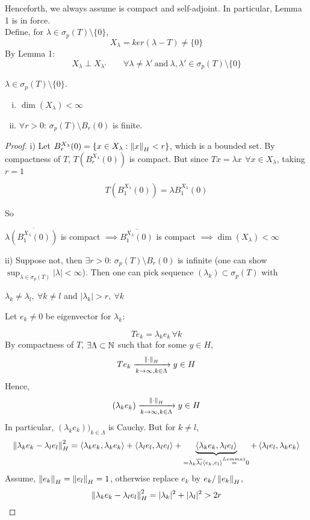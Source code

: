 \documentclass{article}
\begin{document}
Henceforth, we always assume  is compact and self-adjoint. In particular, Lemma 1 is in force.\\
Define, for $\lambda\in\sigma_p(T)\setminus\{0\}$, 
$$X_\lambda=ker(\lambda-T)\neq\{0\}$$
By Lemma 1:
$$X_{\lambda} \perp X_{\lambda '} \qquad \forall \lambda \neq {\lambda '} \ \text{and} \ \lambda , {\lambda '} \in \sigma_p(T)\setminus\{0\}$$
\begin{lemma}[Lemma 2]
	$\lambda\in\sigma_p(T)\setminus\{0\}$.
	\begin{enumerate}[i)]
		\item $\dim (X_\lambda)<\infty$
		\item $\forall r>0$: $\sigma_p(T)\setminus B_r(0)$ is finite.
	\end{enumerate}
\end{lemma}
\begin{proof}
		i) Let $B_r^{X_\lambda}(0)=\{x\in X_\lambda:\left\|{x}\right\|_H<r\}$, which is a bounded set. By compactness of $T$, $T(B_r^{X_\lambda}(0))$ is compact. 
  But since $Tx=\lambda x\, \ \forall x\in X_\lambda$, taking $r=1$
  
  $$T(B_1^{X_\lambda}(0))=\lambda B_1^{X_\lambda}(0)$$
  
  So
  \begin{center}
        $\lambda\overline{(B_1^{X_\lambda}(0))}$ is compact $\implies \overline{B_1^{X_\lambda}(0)}$ is compact $\implies \dim(X_\lambda)<\infty$
  \end{center}
ii) Suppose not, then $\exists r>0$: $\sigma_p(T)\setminus B_r(0)$ is infinite (one can show $\sup_{\lambda\in\sigma_p(T)}|\lambda|<\infty$). 
Then one can pick sequence $(\lambda_k)\subset\sigma_p(T)$ with 
\begin{center}
$\lambda_k\neq\lambda_l, \ \forall k\neq l$ and $|\lambda_k|>r, \ \forall k$    
\end{center}

Let $e_k\neq0$ be eigenvector for $\lambda_k$: 

$$Te_k=\lambda_ke_k\,\forall k$$ 
By compactness of $T$, $\exists\Lambda\subset\mathbb{N}$ such that for some $y\in H$, $$Te_k\xrightarrow[k\to\infty,k\in\Lambda]{\left\|{\cdot}\right\|_H}y\in H$$
		Hence,
		$$(\lambda_ke_k)\xrightarrow[k\to\infty,k\in\Lambda]{\left\|{\cdot}\right\|_H}y\in H$$
		In particular, $(\lambda_ke_k))_{k\in\Lambda}$ is Cauchy. But for $k\neq l$,
		$$\left\|{\lambda_ke_k-\lambda_le_l}\right\|^2_H=
                \left<{\lambda_ke_k},{\lambda_ke_k}\right>
			+\left<{\lambda_le_l},{\lambda_le_l}\right>
			+\underbrace{\left<{\lambda_ke_k},{\lambda_le_l}\right>}_{=\lambda_k\overline{\lambda_l}\left<{e_k},{e_l}\right>\stackrel{Lemma1}{=}0}
			+\left<{\lambda_le_l},{\lambda_ke_k}\right>
		$$
		Assume, $\left\|{e_k}\right\|_H=\left\|{e_l}\right\|_H=1$, otherwise replace $e_k$ by $e_k/\left\|{e_k}\right\|_H$,
		$$
			\left\|{\lambda_ke_k-\lambda_le_l}\right\|^2_H=|\lambda_k|^2+|\lambda_l|^2>2r
		$$
\end{proof}  
\end{document}
